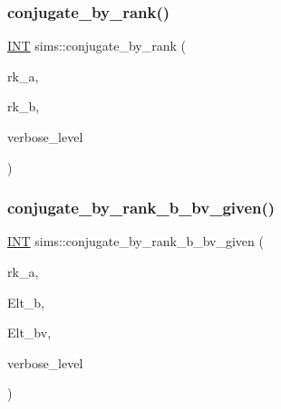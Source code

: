 \mbox{\label{classsims_aa160a4a48cab8dc42e68ef955c98b17c}} 
\subsubsection{\texorpdfstring{conjugate\+\_\+by\+\_\+rank()}{conjugate\_by\_rank()}}
{\footnotesize\ttfamily \mbox{\hyperlink{galois_8h_a09fddde158a3a20bd2dcadb609de11dc}{I\+NT}} sims\+::conjugate\+\_\+by\+\_\+rank (\begin{DoxyParamCaption}\item[{\mbox{\hyperlink{galois_8h_a09fddde158a3a20bd2dcadb609de11dc}{I\+NT}}}]{rk\+\_\+a,  }\item[{\mbox{\hyperlink{galois_8h_a09fddde158a3a20bd2dcadb609de11dc}{I\+NT}}}]{rk\+\_\+b,  }\item[{\mbox{\hyperlink{galois_8h_a09fddde158a3a20bd2dcadb609de11dc}{I\+NT}}}]{verbose\+\_\+level }\end{DoxyParamCaption})}

\mbox{\label{classsims_ab5d31beb4b697e7c5cb05c530caae96a}} 
\subsubsection{\texorpdfstring{conjugate\+\_\+by\+\_\+rank\+\_\+b\+\_\+bv\+\_\+given()}{conjugate\_by\_rank\_b\_bv\_given()}}
{\footnotesize\ttfamily \mbox{\hyperlink{galois_8h_a09fddde158a3a20bd2dcadb609de11dc}{I\+NT}} sims\+::conjugate\+\_\+by\+\_\+rank\+\_\+b\+\_\+bv\+\_\+given (\begin{DoxyParamCaption}\item[{\mbox{\hyperlink{galois_8h_a09fddde158a3a20bd2dcadb609de11dc}{I\+NT}}}]{rk\+\_\+a,  }\item[{\mbox{\hyperlink{galois_8h_a09fddde158a3a20bd2dcadb609de11dc}{I\+NT}} $\ast$}]{Elt\+\_\+b,  }\item[{\mbox{\hyperlink{galois_8h_a09fddde158a3a20bd2dcadb609de11dc}{I\+NT}} $\ast$}]{Elt\+\_\+bv,  }\item[{\mbox{\hyperlink{galois_8h_a09fddde158a3a20bd2dcadb609de11dc}{I\+NT}}}]{verbose\+\_\+level }\end{DoxyParamCaption})}


